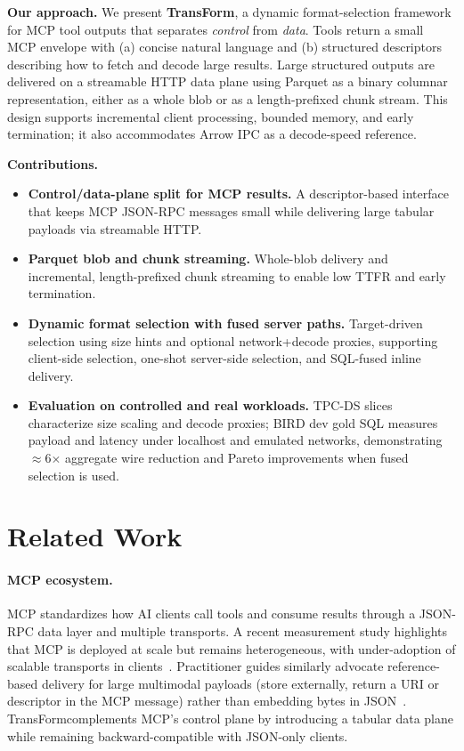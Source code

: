 \documentclass[sigconf, nonacm]{acmart}
\newcommand{\system}{TransForm}
\begin{document}
\smallskip
\noindent\textbf{Our approach.}
We present \textbf{\system}, a dynamic format-selection framework for MCP tool outputs that separates \emph{control} from \emph{data}. Tools return a small MCP envelope with (a) concise natural language and (b) structured descriptors describing how to fetch and decode large results. Large structured outputs are delivered on a streamable HTTP data plane using Parquet as a binary columnar representation, either as a whole blob or as a length-prefixed chunk stream. This design supports incremental client processing, bounded memory, and early termination; it also accommodates Arrow IPC as a decode-speed reference.

\smallskip
\noindent\textbf{Contributions.}
\begin{itemize}
  \item \textbf{Control/data-plane split for MCP results.} A descriptor-based interface that keeps MCP JSON-RPC messages small while delivering large tabular payloads via streamable HTTP.
  \item \textbf{Parquet blob and chunk streaming.} Whole-blob delivery and incremental, length-prefixed chunk streaming to enable low TTFR and early termination.
  \item \textbf{Dynamic format selection with fused server paths.} Target-driven selection using size hints and optional network+decode proxies, supporting client-side selection, one-shot server-side selection, and SQL-fused inline delivery.
  \item \textbf{Evaluation on controlled and real workloads.} TPC-DS slices characterize size scaling and decode proxies; BIRD dev gold SQL measures payload and latency under localhost and emulated networks, demonstrating $\approx$6$\times$ aggregate wire reduction and Pareto improvements when fused selection is used.
\end{itemize}

\section{Related Work}
\label{sec:related}

\paragraph{MCP ecosystem.}
MCP standardizes how AI clients call tools and consume results through a JSON-RPC data layer and multiple transports. A recent measurement study highlights that MCP is deployed at scale but remains heterogeneous, with under-adoption of scalable transports in clients~\cite{guoMcpEcosystemMeasurement}. Practitioner guides similarly advocate reference-based delivery for large multimodal payloads (store externally, return a URI or descriptor in the MCP message) rather than embedding bytes in JSON~\cite{choubeyMultimodalMcp2025}. \system complements MCP's control plane by introducing a tabular data plane while remaining backward-compatible with JSON-only clients.
\end{document}
